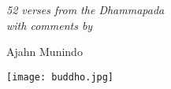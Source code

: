 
\cleartorecto
\thispagestyle{empty}

\vspace*{1em}

{\centering

\vspace*{3\baselineskip}

{\itshape 52 verses from the Dhammapada\\
with comments by}

\vspace*{2\baselineskip}
Ajahn Munindo

\vfill

\texttt{[image: buddho.jpg]}
\vspace*{1.3em}


}
